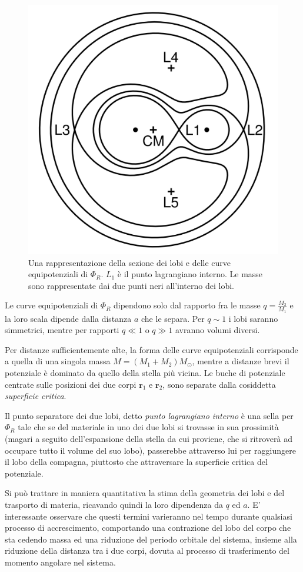 \documentclass[a4paperbi]{article}
\begin{document}
	\begin{figure}[H]
		\centering
		\includegraphics[width=0.6\linewidth]{RocheEquipotential}
		\caption{Una rappresentazione della sezione dei lobi e delle curve equipotenziali di $\Phi_R$. $L_1$ è il punto lagrangiano interno. Le masse sono rappresentate dai due punti neri all'interno dei lobi.}
		\label{fig:rocheequipotential}
	\end{figure}
	
	Le curve equipotenziali di $\Phi_R$ dipendono solo dal rapporto fra le masse $q=\frac{M_2}{M_1}$ e la loro scala dipende dalla distanza $a$ che le separa. Per $q\sim1$ i lobi saranno simmetrici, mentre per rapporti $q\ll1$ o $q\gg1$ avranno volumi diversi.
	
	Per distanze sufficientemente alte, la forma delle curve equipotenziali corrisponde a quella di una singola massa $M=(M_1+M_2)M_\odot$, mentre a distanze brevi il potenziale è dominato da quello della stella più vicina. Le buche di potenziale centrate sulle posizioni dei due corpi $\textbf{r}_1$ e $\textbf{r}_2$, sono separate dalla cosiddetta \textit{superficie critica}.
	
	Il punto separatore dei due lobi, detto \textit{punto lagrangiano interno} è una sella per $\Phi_R$ tale che se del materiale in uno dei due lobi si trovasse in sua prossimità (magari a seguito dell'espansione della stella da cui proviene, che si ritroverà ad occupare tutto il volume del suo lobo), passerebbe attraverso lui per raggiungere il lobo della compagna, piuttosto che attraversare la superficie critica del potenziale.
	
	Si può trattare in maniera quantitativa la stima della geometria dei lobi e del trasporto di materia, ricavando quindi la loro dipendenza da $q$ ed $a$. E' interessante osservare che questi termini varieranno nel tempo durante qualsiasi processo di accrescimento, comportando una contrazione del lobo del corpo che sta cedendo massa ed una riduzione del periodo orbitale del sistema, insieme alla riduzione della distanza tra i due corpi, dovuta al processo di trasferimento del momento angolare nel sistema.
	
\end{document}
